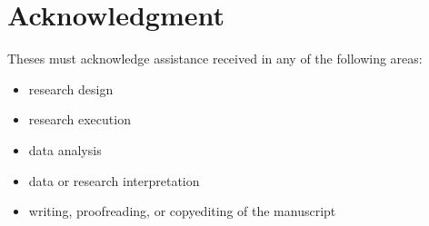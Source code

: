 \chapter*{Acknowledgment} 

Theses must acknowledge assistance received in any of the following areas:

\begin{itemize}
\item research design
\item research execution
\item data analysis
\item data or research interpretation
\item writing, proofreading, or copyediting of the manuscript 
\end{itemize}
